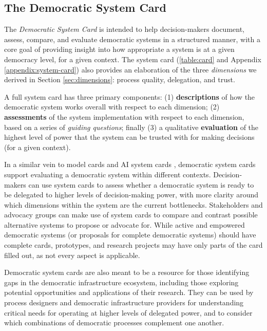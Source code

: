 \documentclass{article}
\begin{document}
\subsection{The Democratic System Card}
\label{sec:card}

    The \textit{Democratic System Card} is intended to help decision-makers document, assess, compare, and evaluate democratic systems in a structured manner, with a core goal of providing insight into how appropriate a system is at a given democracy level, for a given context.
    The system card (\autoref{table:card} and Appendix \ref{appendix:system-card}) also provides an elaboration of the three \textit{dimensions} we derived in Section \ref{sec:dimensions}: process quality, delegation, and trust.

    A full system card has three primary components: (1) \textbf{descriptions} of how the democratic system works overall with respect to each dimension; (2) \textbf{assessments} of the system implementation with respect to each dimension, based on a series of \textit{guiding questions}; finally (3) a qualitative \textbf{evaluation} of the highest level of power that the system can be trusted with for making decisions (for a given context). 

    In a similar vein to model cards and AI system cards \cite{mitchell,sonnet-system-card,gpt4-system-card}, democratic system cards support evaluating a democratic system within different contexts. Decision-makers can use system cards to assess whether a democratic system is ready to be delegated to higher levels of decision-making power, with more clarity around which dimensions within the system are the current bottlenecks.
    Stakeholders and advocacy groups can make use of system cards to compare and contrast possible alternative systems to propose or advocate for. While active and empowered democratic systems (or proposals for complete democratic systems) should have complete cards, prototypes, and research projects may have only parts of the card filled out, as not every aspect is applicable.

    Democratic system cards are also meant to be a resource for those identifying gaps in the democratic infrastructure ecosystem, including those exploring potential opportunities and applications of their research. They can be used by process designers and democratic infrastructure providers for understanding critical needs for operating at higher levels of delegated power, and to consider which combinations of democratic processes complement one another. 
    
\end{document}
